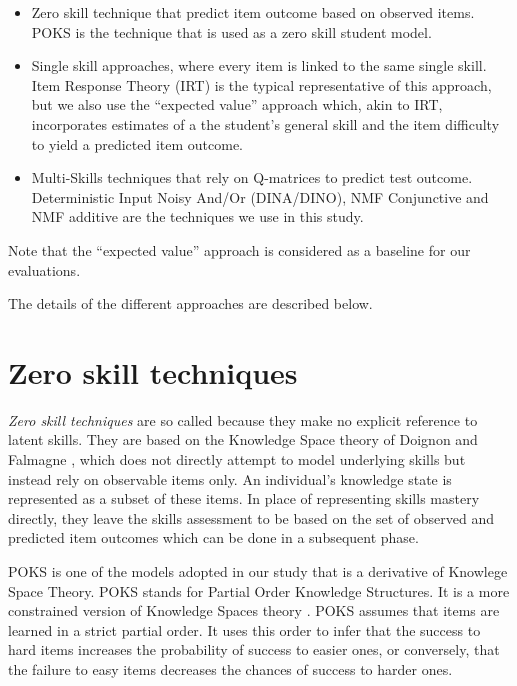 \begin{itemize}

\item Zero skill technique that predict item outcome based on observed items. POKS is the technique that is used as a zero skill student model.
\item Single skill approaches, where every item is linked to the same single skill. Item Response Theory (IRT) is the typical representative of this approach, but we also use the ``expected value'' approach which, akin to IRT, incorporates estimates of a the student's general skill and the item difficulty to yield a predicted item outcome.
\item Multi-Skills techniques that rely on Q-matrices to predict test outcome.  Deterministic Input Noisy And/Or (DINA/DINO), NMF Conjunctive and \ac{NMF} additive are the techniques we use in this study.

\end{itemize}  
Note that the ``expected value'' approach is considered as a baseline for our evaluations. 

The details of the different approaches are described below.

\section{Zero skill techniques}

\textit{Zero skill techniques} are so called because they make no explicit reference to latent skills.  They are based on the Knowledge Space theory of Doignon and Falmagne \citep{Doignon1999,desmarais:umuai:2006}, which does not directly attempt to model underlying skills but instead rely on observable items only.  An individual's knowledge state is represented as a subset of these items. In place of representing skills mastery directly, they leave the skills assessment to be based on the set of observed and predicted item outcomes which can be done in a subsequent phase. 

POKS is one of the models adopted in our study that is a derivative of Knowlege Space Theory.  POKS stands for Partial Order Knowledge Structures.  It is a more constrained version of Knowledge Spaces theory \citep{desmarais:umuai:1995}.  POKS assumes that items are learned in a strict partial order.  It uses this order to infer that the success to hard items increases the probability of success to easier ones, or conversely, that the failure to easy items decreases the chances of success to harder ones.


